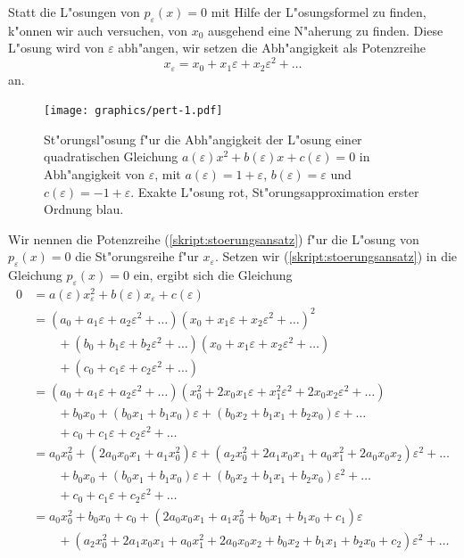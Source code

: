Statt die L"osungen von $p_{\varepsilon}(x)=0$ mit Hilfe der L"osungsformel
zu finden, k"onnen wir auch versuchen, von $x_0$ ausgehend eine N"aherung
zu finden. Diese L"osung wird von $\varepsilon$ abh"angen, wir setzen
die Abh"angigkeit als Potenzreihe
\begin{equation}
x_\varepsilon = x_0 + x_1\varepsilon +x_2 \varepsilon^2+\dots
\label{skript:stoerungsansatz}
\end{equation}
an.
\begin{figure}
\centering
\texttt{[image: graphics/pert-1.pdf]}
\caption{St"orungsl"osung f"ur die Abh"angigkeit der L"osung einer
quadratischen Gleichung $a(\varepsilon)x^2+b(\varepsilon)x+c(\varepsilon)=0$
in Abh"angigkeit von $\varepsilon$,
mit $a(\varepsilon)=1+\varepsilon$, $b(\varepsilon)=\varepsilon$ und
$c(\varepsilon)=-1+\varepsilon$. Exakte L"osung {\color{red} rot}, 
St"orungsapproximation erster Ordnung {\color{blue} blau}.
\label{skript:stoerungsloesung}}
\end{figure}
Wir nennen die Potenzreihe (\ref{skript:stoerungsansatz}) f"ur die L"osung
von $p_\varepsilon(x)=0$ die St"orungsreihe f"ur $x_\varepsilon$.
Setzen wir (\ref{skript:stoerungsansatz}) in die Gleichung $p_{\varepsilon}(x)=0$
ein, ergibt sich die Gleichung
\begin{align*}
0&=a(\varepsilon)x_\varepsilon^2+b(\varepsilon)x_\varepsilon+c(\varepsilon)
\\
&=
(a_0+a_1\varepsilon+a_2\varepsilon^2+\dots)
(x_0+x_1\varepsilon+x_2\varepsilon^2+\dots)^2\\
&\qquad
+
(b_0+b_1\varepsilon+b_2\varepsilon^2+\dots)
(x_0+x_1\varepsilon+x_2\varepsilon^2+\dots)\\
&\qquad
+
(c_0+c_1\varepsilon+c_2\varepsilon^2+\dots)
\\
&=
(a_0+a_1\varepsilon+a_2\varepsilon^2+\dots)
(x_0^2+2x_0x_1\varepsilon +x_1^2\varepsilon^2+2x_0x_2\varepsilon^2+\dots)
\\
&\qquad
+
b_0x_0 + (b_0x_1+b_1x_0)\varepsilon+(b_0x_2+b_1x_1+b_2x_0)\varepsilon+\dots\\
&\qquad
+
c_0+c_1\varepsilon+c_2\varepsilon^2+\dots
\\
&=
a_0x_0^2 + (2a_0x_0x_1 + a_1x_0^2)\varepsilon +
(a_2x_0^2 + 2a_1x_0x_1 + a_0x_1^2 +2a_0x_0x_2)\varepsilon^2+\dots
\\
&\qquad
+
b_0x_0 + (b_0x_1+b_1x_0)\varepsilon+(b_0x_2+b_1x_1+b_2x_0)\varepsilon^2+\dots\\
&\qquad
+
c_0+c_1\varepsilon+c_2\varepsilon^2+\dots
\\
&=
a_0x_0^2 + b_0x_0+c_0
+(2a_0x_0x_1+a_1x_0^2+b_0x_1+b_1x_0+c_1)\varepsilon
\\
&\qquad
+(
a_2x_0^2 + 2a_1x_0x_1 + a_0x_1^2 +2a_0x_0x_2
+b_0x_2+b_1x_1+b_2x_0
+c_2
)\varepsilon^2+\dots
\end{align*}

